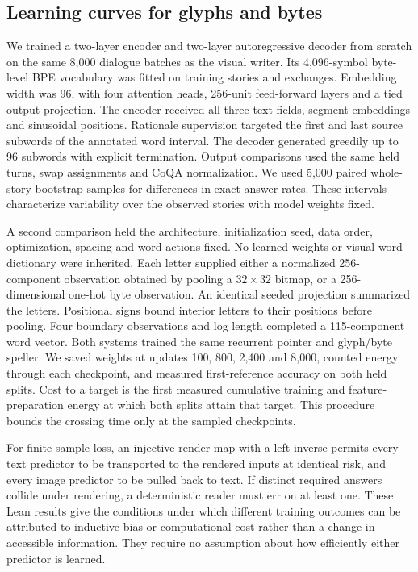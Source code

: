 \subsection*{Learning curves for glyphs and bytes}
We trained a two-layer encoder and two-layer autoregressive decoder from scratch on the same 8,000 dialogue batches as the visual writer. Its 4,096-symbol byte-level BPE vocabulary was fitted on training stories and exchanges. Embedding width was 96, with four attention heads, 256-unit feed-forward layers and a tied output projection. The encoder received all three text fields, segment embeddings and sinusoidal positions. Rationale supervision targeted the first and last source subwords of the annotated word interval. The decoder generated greedily up to 96 subwords with explicit termination. Output comparisons used the same held turns, swap assignments and CoQA normalization. We used 5,000 paired whole-story bootstrap samples for differences in exact-answer rates. These intervals characterize variability over the observed stories with model weights fixed.

A second comparison held the architecture, initialization seed, data order, optimization, spacing and word actions fixed. No learned weights or visual word dictionary were inherited. Each letter supplied either a normalized 256-component observation obtained by pooling a $32\times32$ bitmap, or a 256-dimensional one-hot byte observation. An identical seeded projection summarized the letters. Positional signs bound interior letters to their positions before pooling. Four boundary observations and log length completed a 115-component word vector. Both systems trained the same recurrent pointer and glyph/byte speller. We saved weights at updates 100, 800, 2,400 and 8,000, counted energy through each checkpoint, and measured first-reference accuracy on both held splits. Cost to a target is the first measured cumulative training and feature-preparation energy at which both splits attain that target. This procedure bounds the crossing time only at the sampled checkpoints.

For finite-sample loss, an injective render map with a left inverse permits every text predictor to be transported to the rendered inputs at identical risk, and every image predictor to be pulled back to text. If distinct required answers collide under rendering, a deterministic reader must err on at least one. These Lean results give the conditions under which different training outcomes can be attributed to inductive bias or computational cost rather than a change in accessible information. They require no assumption about how efficiently either predictor is learned.

